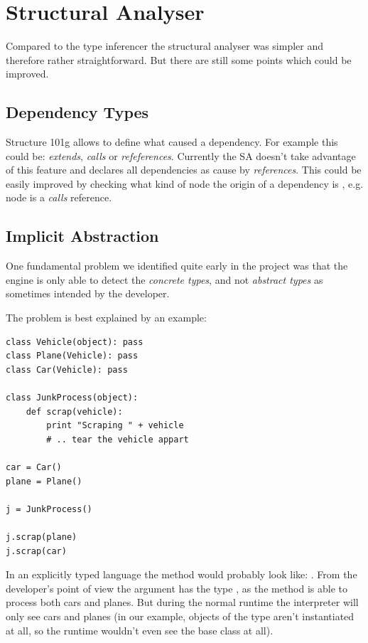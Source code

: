\documentclass[12pt,halfparskip,DIV11,BCOR10mm]{scrreprt}
\begin{document}
\section{Structural Analyser}

Compared to the type inferencer the structural analyser was simpler and therefore rather straightforward. But there are still some points which could be improved.

\subsection{Dependency Types}

Structure 101g allows to define what caused a dependency. For example this could be: \emph{extends}, \emph{calls} or \emph{refeferences}. Currently the SA doesn't take advantage of this feature and declares all dependencies as cause by \emph{references}. This could be easily improved by checking what kind of node the origin of a dependency is , e.g.  node is a \emph{calls} reference.

\subsection{Implicit Abstraction}

One fundamental problem we identified quite early in the project was that the engine is only able to detect the \emph{concrete types}, and not \emph{abstract types} as sometimes intended by the developer.

The problem is best explained by an example:

\begin{lstlisting}
class Vehicle(object): pass
class Plane(Vehicle): pass
class Car(Vehicle): pass

class JunkProcess(object): 
    def scrap(vehicle):
        print "Scraping " + vehicle
        # .. tear the vehicle appart
        
car = Car()
plane = Plane()

j = JunkProcess()

j.scrap(plane)
j.scrap(car)
\end{lstlisting}

In an explicitly typed language the  method would probably look like: . From the developer's point of view the argument has the type , as the method is able to process both cars and planes. But during the normal runtime the interpreter will only see cars and planes (in our example, objects of the type  aren't instantiated at all, so the runtime wouldn't even see the base class at all).
\end{document}
